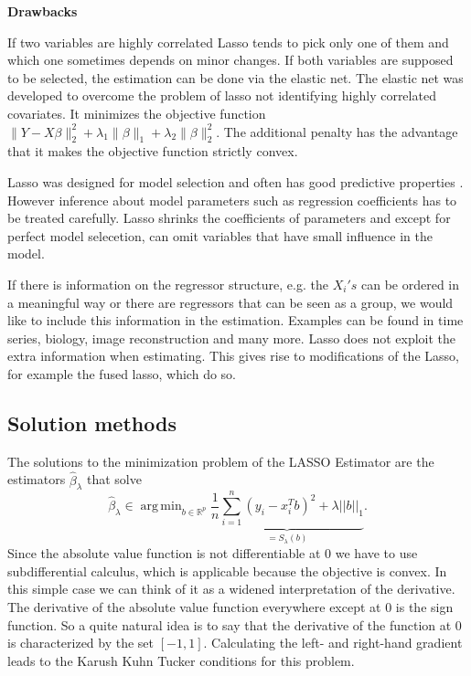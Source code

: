 \documentclass{article}
\theoremstyle{definition}
\DeclareMathOperator*{\argmin}{arg\,min}
\begin{document}
\noindent\textbf{Drawbacks} \newline

\noindent If two variables are highly correlated Lasso tends to pick only one of them and which one sometimes depends on minor changes.  If both variables are supposed to be selected, the estimation can be done via the elastic net. The elastic net was developed to overcome the problem of lasso not identifying highly correlated covariates. It minimizes the objective function $\| Y-X\beta\|_2^2+\lambda_1 \| \beta\|_1 +\lambda_2\|\beta\|_2^2$. The additional penalty has the advantage that it makes the objective function strictly convex.

Lasso was designed for model selection and often has good predictive properties \citep{belloni2014}. However inference about model parameters such as regression coefficients has to be treated carefully. Lasso shrinks the coefficients of parameters and except for perfect model selecetion, can omit variables that have small influence in the model.

If there is information on the regressor structure, e.g. the $X_i's$ can be ordered in a meaningful way or there are regressors that can be seen as a group, we would like to include this information in the estimation. Examples can be found in time series, biology, image reconstruction and many more.
Lasso does not exploit the extra information when estimating. This gives rise to modifications of the Lasso, for example the fused lasso, which do so. 

\subsection{Solution methods}


The solutions to the minimization problem of the LASSO Estimator are the estimators $\hat\beta_\lambda$ that solve
$$\hat\beta_\lambda \in \argmin_{b\in \mathbb{R}^p}\underbrace{\frac{1}{n}\sum_{i=1}^{n}(y_i-x_i^Tb)^2+\lambda||b||_1}_{=S_\lambda (b)}.$$
%
Since the absolute value function is not differentiable at 0 we have to use subdifferential calculus, which is applicable because the objective is convex. In this simple case we can think of it as a widened interpretation of the derivative. The derivative of the absolute value function everywhere except at 0 is the sign function. So a quite natural idea is to say that the derivative of the function at 0 is characterized by the set $[-1,1]$. Calculating the left- and right-hand gradient leads to the Karush Kuhn Tucker conditions for this problem.
\end{document}
